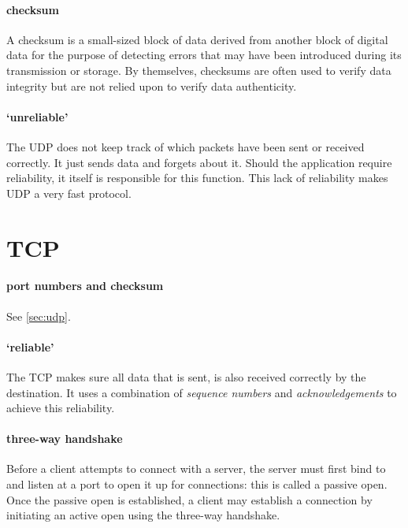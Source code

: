 \paragraph{checksum}
A checksum is a small-sized block of data derived from another block of digital data for the purpose of detecting errors that may have been introduced during its transmission or storage.
By themselves, checksums are often used to verify data integrity but are not relied upon to verify data authenticity.

\paragraph{`unreliable'}
The \ac{UDP} does not keep track of which packets have been sent or received correctly.
It just sends data and forgets about it.
Should the application require reliability, it itself is responsible for this function.
This lack of reliability makes \ac{UDP} a very fast protocol.









\section{\acl{TCP}}
\label{sec:tcp}


\paragraph{port numbers and checksum}
See \cref{sec:udp}.

\paragraph{`reliable'}
The \ac{TCP} makes sure all data that is sent, is also received correctly by the destination.
It uses a combination of \emph{sequence numbers} and \emph{acknowledgements} to achieve this reliability.

\paragraph{three-way handshake}
Before a client attempts to connect with a server, the server must first bind to and listen at a port to open it up for connections: this is called a passive open.
Once the passive open is established, a client may establish a connection by initiating an active open using the three-way handshake.%

